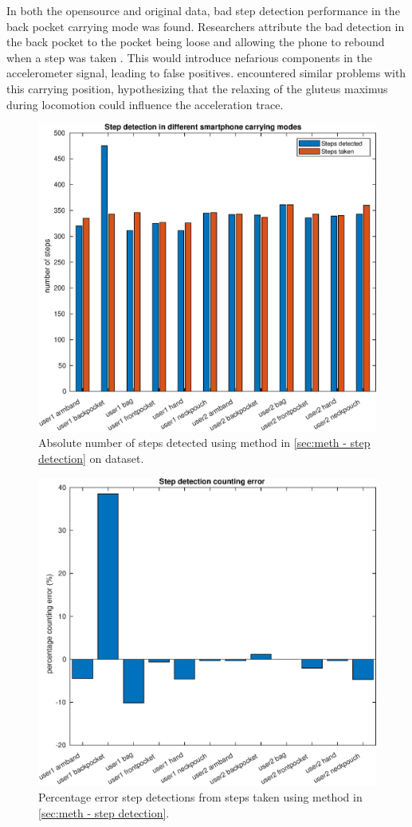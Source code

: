 In both the opensource and original data, bad step detection performance in the back pocket carrying mode was found. Researchers attribute the bad detection in the back pocket to the pocket being loose and allowing the phone to rebound when a step was taken \cite{Salvi2018}. This would introduce nefarious components in the accelerometer signal, leading to false positives. \citet{Brajdic2013} encountered similar problems with this carrying position, hypothesizing that the relaxing of the gluteus maximus during locomotion could influence the acceleration trace.

	\begin{figure}[htbp]
		\centering
		\includegraphics[width=0.7\linewidth]{images/20201127_1516_Step_detection_in_different_smartphone_carrying_modes}
		
		\caption{Absolute number of steps detected using method in \cref{sec:meth - step detection} on \citet{Brajdic2013} dataset.}
		\label{fig:sd_abs_comparison}
	\end{figure}
	\begin{figure}[H]
		\centering
		\includegraphics[width=0.7\linewidth]{images/20201127_1520_Step_detection_counting_error}
		\setlength{\belowcaptionskip}{-10pt}
		\caption{Percentage error step detections from steps taken using method in \cref{sec:meth - step detection}. }
		\label{fig:sd_percent_comparison}
	\end{figure}

